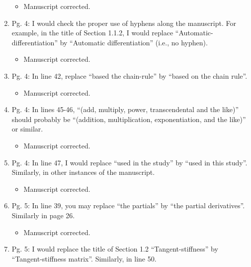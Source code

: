 \documentclass{article}
\begin{document}
\begin{enumerate}
{\color{red}  
\begin{itemize}
     \item
 Manuscript corrected. 
  \end{itemize}}

 \item Pg. 4: I would check the proper use of hyphens along the manuscript. For example,
in the title of Section 1.1.2, I would replace “Automatic-differentiation” by “Automatic
differentiation” (i.e., no hyphen).

{\color{red}  
\begin{itemize}
     \item
 Manuscript corrected. 
  \end{itemize}}

 \item Pg. 4: In line 42, replace “based the chain-rule” by “based on the chain rule”.

{\color{red}  
\begin{itemize}
     \item
 Manuscript corrected. 
  \end{itemize}}

 \item Pg. 4: In lines 45-46, “(add, multiply, power, transcendental and the like)” should
probably be “(addition, multiplication, exponentiation, and the like)” or similar.

{\color{red}  
\begin{itemize}
     \item
 Manuscript corrected. 
  \end{itemize}}

 \item Pg. 4: In line 47, I would replace “used in the study” by “used in this study”. Similarly,
in other instances of the manuscript.

{\color{red}  
\begin{itemize}
     \item
 Manuscript corrected. 
  \end{itemize}}

 \item Pg. 5: In line 39, you may replace “the partials” by “the partial derivatives”. Similarly
in page 26.

{\color{red}  
\begin{itemize}
     \item
 Manuscript corrected. 
  \end{itemize}}

 \item Pg. 5: I would replace the title of Section 1.2 “Tangent-stiffness” by “Tangent-stiffness
matrix”. Similarly, in line 50.


\end{enumerate}
\end{document}
